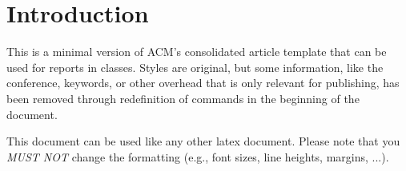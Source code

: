 \section{Introduction}

This is a minimal version of ACM's consolidated article template that can be used for reports in classes.
Styles are original, but some information, like the conference, keywords, or other overhead that is only relevant for publishing, has been removed through redefinition of commands in the beginning of the document.

This document can be used like any other latex document. Please note that you \emph{MUST NOT} change the formatting (e.g., font sizes, line heights, margins, ...).

